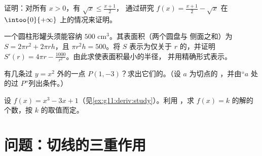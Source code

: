 \begin{exercise}[$\star\star$]\label{exo:g11:deriv:9}
证明：对所有 $x > 0$，有 $\sqrt{x} \leq \frac{x + 1}{2}$，
通过研究 $f(x) = \frac{x+1}{2} - \sqrt x$ 在 $\intoo{0}{+\infty}$ 上的情况来证明。
\end{exercise}

\begin{exercise}[$\star\star$]\label{exo:g11:deriv:10}
一个圆柱形罐头须能容纳 $500$ cm$^3$。其表面积（两个圆盘与
侧面之和）为 $S = 2\pi r^2 + 2\pi r h$，且 $\pi r^2 h = 500$。将 $S$
表示为仅关于 $r$ 的，并证明 $S'(r) = 4\pi r -
\frac{1000}{r^2}$。由此求使表面积最小的半径，
并用精确形式表示。
\end{exercise}

\begin{exercise}[$\star\star\star$]\label{exo:g11:deriv:11}
有几条过 $y = x^2$ 外的一点
$P(1, -3)$？求出它们的。（设 $a$ 为切点的
，并由“$a$ 处的过 $P$”列出条件。）
\end{exercise}

\begin{exercise}[$\star\star\star$]\label{exo:g11:deriv:12}
设 $f(x) = x^3 - 3x + 1$（见\cref{ex:g11:deriv:study}）。利用
，求
$f(x) = k$ 的解的个数，按 $k$ 的取值而定。
\end{exercise}

\section{问题：切线的三重作用}

